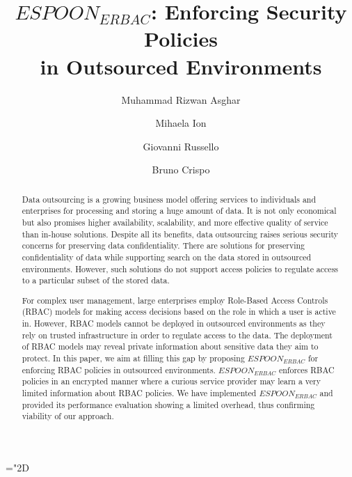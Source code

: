 \documentclass[final,5p,times,twocolumn]{elsarticle}
\begin{document}





\mathchardef\mhyphen="2D

\begin{frontmatter}





\title{$\mathit{ESPOON_{ERBAC}}$: Enforcing Security Policies \\ in Outsourced Environments}



\author[cn,disi]{Muhammad Rizwan Asghar}
\author[cn,disi]{Mihaela Ion}
\author[nz]{Giovanni Russello}
\author[disi]{Bruno Crispo}


\address[cn]{CREATE-NET, International Research Center, Trento Italy}

\address[nz]{Department of Computer Science, The University of Auckland, Auckland New Zealand}

\address[disi]{Department of Information Engineering and Computer Science, University of Trento, Trento Italy}


\begin{abstract}

Data outsourcing is a growing business model offering services to individuals and enterprises for processing and storing a huge amount of data. It is not only economical but also promises higher availability, scalability, and more effective quality of service than in-house solutions. Despite all its benefits, data outsourcing raises serious security concerns for preserving data confidentiality. There are solutions for preserving confidentiality of data while supporting search on the data stored in outsourced environments. However, such solutions do not support access policies to regulate access to a particular subset of the stored data. 

For complex user management, large enterprises employ Role-Based Access Controls (RBAC) models for making access decisions based on the role in which a user is active in. However, RBAC models cannot be deployed in outsourced environments as they rely on trusted infrastructure in order to regulate access to the data. The deployment of RBAC models may reveal private information about sensitive data they aim to protect. In this paper, we aim at filling this gap by proposing \textbf{$\mathit{ESPOON_{ERBAC}}$} for enforcing RBAC policies in outsourced environments. $\mathit{ESPOON_{ERBAC}}$ enforces RBAC policies in an encrypted manner where a curious service provider may learn a very limited information about RBAC policies. We have implemented $\mathit{ESPOON_{ERBAC}}$ and provided its performance evaluation showing a limited overhead, thus confirming viability of our approach.


\end{abstract}
\end{frontmatter}
\end{document}
